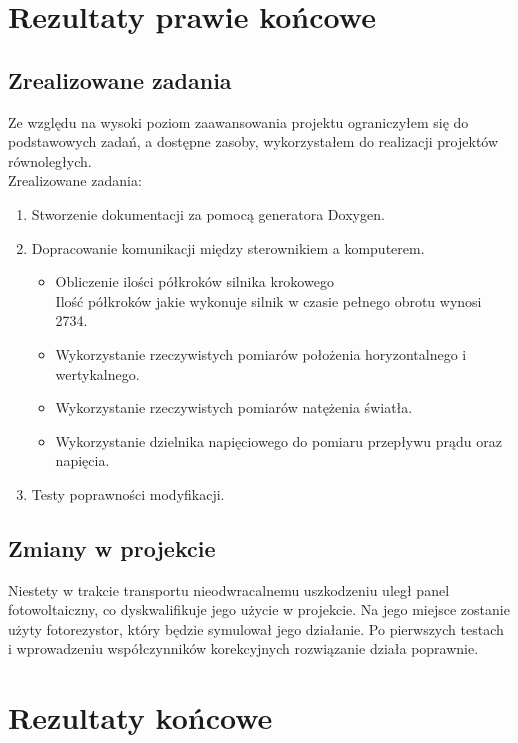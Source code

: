 \documentclass[10pt, a4paper]{article}
\begin{document}
\section{Rezultaty prawie końcowe}
	\subsection{Zrealizowane zadania}
	Ze względu na wysoki poziom zaawansowania projektu ograniczyłem się do podstawowych zadań, a dostępne zasoby, wykorzystałem do realizacji projektów równoległych. \\
	Zrealizowane zadania:
		\begin{enumerate}
			\item  Stworzenie dokumentacji za pomocą generatora Doxygen.
			\item Dopracowanie komunikacji między sterownikiem a komputerem.
			\begin{itemize}
				\item Obliczenie ilości półkroków silnika krokowego \\ Ilość półkroków jakie wykonuje silnik w czasie pełnego obrotu wynosi 2734.
				\item Wykorzystanie rzeczywistych pomiarów położenia horyzontalnego i wertykalnego.
				\item Wykorzystanie rzeczywistych pomiarów natężenia światła.
				\item Wykorzystanie dzielnika napięciowego do pomiaru przepływu prądu oraz napięcia.
			\end{itemize}
			\item Testy poprawności modyfikacji.
		\end{enumerate}
	
	\subsection{Zmiany w projekcie}
	Niestety w trakcie transportu nieodwracalnemu uszkodzeniu uległ panel fotowoltaiczny, co dyskwalifikuje jego użycie w projekcie. Na jego miejsce zostanie użyty fotorezystor, który będzie symulował jego działanie. Po pierwszych testach i wprowadzeniu współczynników korekcyjnych rozwiązanie działa poprawnie.
	
\section{Rezultaty końcowe}
\end{document}

